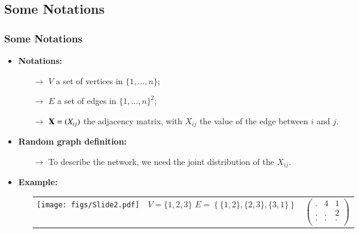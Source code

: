 \documentclass{beamer}
\newcommand{\Xbf}{{\bf X}}
\begin{document}
\subsection{Some Notations}

\begin{frame}
  \frametitle{Some Notations}
  \begin{itemize}
  \item
    \textbf{Notations:}
    \begin{itemize}
    \item[\bf{$\rightarrow$}] $V$ a set of vertices in $\{1,\dots,n\}$;\medskip
    \item[\bf{$\rightarrow$}] $E$ a set of edges in $\{1,\dots,n\}^2$;\medskip
    \item[\bf{$\rightarrow$}] $\Xbf=(X_{ij})$ the adjacency matrix, with
      $X_{ij}$ the value of the edge between $i$ and $j$.\medskip
    \end{itemize}
  \item
    \textbf{Random graph definition:}
    \begin{itemize}
    \item[\bf{$\rightarrow$}] To describe the network, we need the joint distribution
    of the $X_{ij}$.
    \end{itemize}
    \medskip
    \pause
  \item
    \textbf{Example:}
    \begin{itemize}
    \item[]
      \begin{tabular}{cp{3.5cm}p{2.5cm}}
        \texttt{[image: figs/Slide2.pdf]} &
        \vspace{-1.25cm} \mbox{$V=\{1,2,3\}$} \mbox{$E=\left\{
            \{1,2\},\{2,3\},\{3,1\} \right\}$} &
        \vspace{-1.5cm}
        $
        \left(
          \begin{array}{ccc}
            . & 4 & 1 \\
            . & . & 2 \\
            . & . & . \\
          \end{array}
        \right)
        $
      \end{tabular}
    \end{itemize}
  \end{itemize}

\end{frame}
\end{document}
